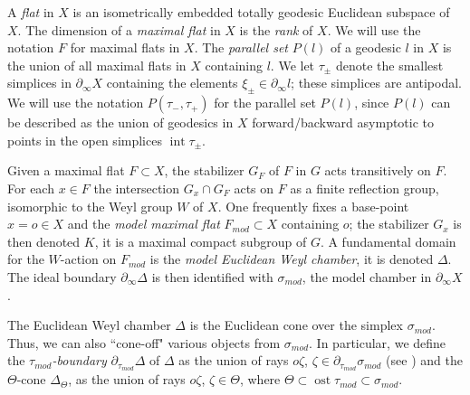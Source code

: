 \documentclass[12pt]{article}
\theoremstyle{boldplain}
\theoremstyle{bolddefinition}
\numberwithin{equation}{section}
\def\De{\Delta}
\def\si{\sigma}
\def\Dt{\partial_{\tau_{mod}}}
\def\Fmod{F_{mod}}
\def\geo{\partial_{\infty}}
\def\inte{\operatorname{int}}
\def\simod{\si_{mod}}
\def\ost{\operatorname{ost}}
\def\taumod{\tau_{mod}}
\begin{document}
 
 A {\em flat} in $X$ is an isometrically embedded totally geodesic Euclidean subspace of $X$. The dimension of a {\em maximal flat} in $X$ is the {\em rank} of $X$. We will use the notation $F$ for maximal flats in $X$.%
 The {\em parallel set} $P(l)$ of a geodesic $l$ in $X$ is the union of all maximal flats in $X$ containing $l$. We let $\tau_\pm$ denote the smallest simplices in $\geo X$ containing 
 the elements $\xi_\pm\in \geo l$; these simplices are antipodal. We will use the notation 
 $P(\tau_-,\tau_+)$ for the parallel set $P(l)$, since $P(l)$ can be described as the union of geodesics in $X$ forward/backward asymptotic to points in the open simplices $\inte\tau_\pm$. 
 
 
Given a maximal flat $F\subset X$, the stabilizer $G_F$ of $F$ in $G$ acts transitively on $F$. 
 For each $x\in F$ the intersection $G_x\cap G_F$ acts on $F$ as a finite reflection group, isomorphic to the Weyl group $W$ of $X$. One frequently fixes a base-point $x=o\in X$ and the {\em model maximal flat} $\Fmod\subset X$ containing $o$; the stabilizer $G_x$ is then denoted $K$, it is a maximal compact subgroup of $G$. A fundamental domain for the $W$-action on $\Fmod$ is 
 the {\em model Euclidean Weyl chamber}, it is denoted $\Delta$. The ideal boundary $\geo \Delta$  is then identified with $\simod$, the model chamber in $\geo X$. 
 
 
The Euclidean Weyl chamber $\De$ is the Euclidean cone over the simplex $\simod$. Thus, we can also ``cone-off" various objects from $\simod$. In particular, we define  the {\em $\taumod$-boundary} 
$\Dt\De$ of $\De$  as the union of rays $o\zeta$, $\zeta\in \Dt \simod$  (see \cite[\S 2.5.2]{anolec})
and the $\Theta$-cone $\Delta_\Theta$, as the union of rays $o\zeta$, $\zeta\in \Theta$, where 
$\Theta\subset \ost\taumod\subset \simod$. 



 
 
 
\end{document}
